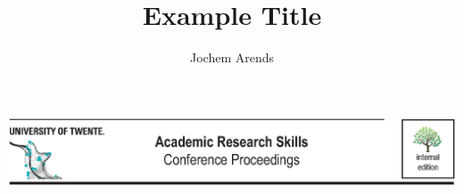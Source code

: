 \documentclass{paper}
\title{Example Title}
\author{Jochem Arends}
\begin{document}
\printlength\columnwidth
\maketitle
\clearpage

\includegraphics{header.eps}
\end{document}
